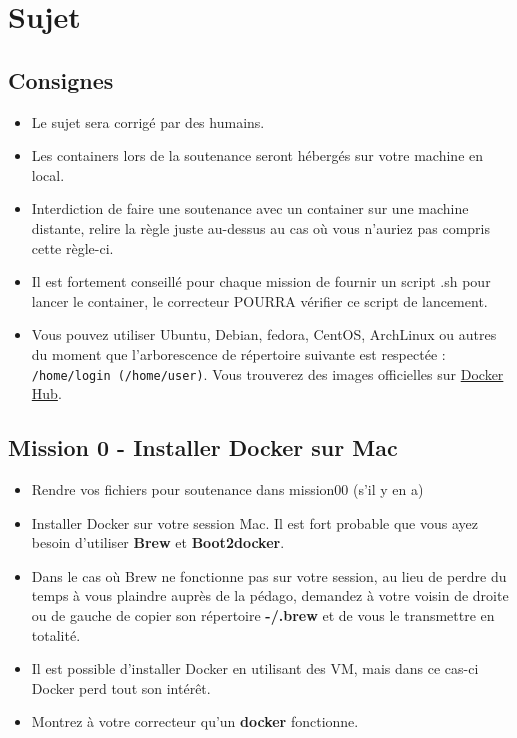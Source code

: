 \documentclass{42}
\begin{document}
	\newpage

\chapter{Sujet}

\section{Consignes}
\begin{itemize}
	\item Le sujet sera corrigé par des humains.
	\item Les containers lors de la soutenance seront hébergés sur votre machine en local.
	\item Interdiction de faire une soutenance avec un container sur une machine distante, relire la règle juste au-dessus au cas où vous n’auriez pas compris cette règle-ci.
	\item Il est fortement conseillé pour chaque mission de fournir un script .sh pour lancer le container, le correcteur POURRA vérifier ce script de lancement.
	\item Vous pouvez utiliser Ubuntu, Debian, fedora, CentOS, ArchLinux ou autres du moment que l'arborescence de répertoire suivante est respectée :  \texttt{/home/login (/home/user)}. Vous trouverez des images officielles sur \href{https://registry.hub.docker.com/search?q=library}{Docker Hub}.
\end{itemize}

	\newpage

\section{Mission 0 - Installer Docker sur Mac}

\begin{itemize}
	\item Rendre vos fichiers pour soutenance dans mission00 (s’il y en a)
	\item Installer Docker sur votre session Mac. Il est fort probable que vous ayez besoin d’utiliser \textbf{Brew} et \textbf{Boot2docker}.
	\item Dans le cas où Brew ne fonctionne pas sur votre session, au lieu de perdre du temps à vous plaindre auprès de la pédago, demandez à votre voisin de droite ou de gauche de copier son répertoire \textbf{-/.brew} et de vous le transmettre en totalité.
	\item Il est possible d’installer Docker en utilisant des VM, mais dans ce cas-ci Docker perd tout son intérêt.
	\item Montrez à votre correcteur qu’un \textbf{docker} fonctionne.
\end{itemize}
\end{document}

